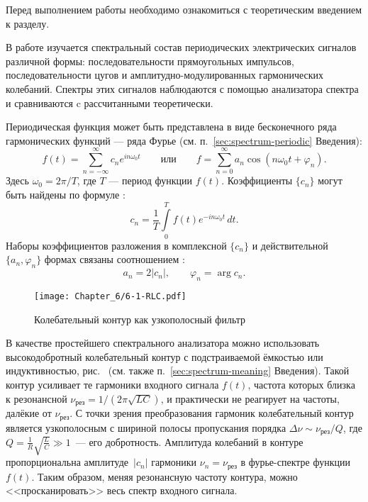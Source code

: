 

Перед выполнением работы необходимо ознакомиться с теоретическим введением
к разделу.

В работе изучается спектральный состав периодических электрических сигналов
различной формы: последовательности прямоугольных импульсов, последовательности
цугов и амплитудно-модулированных гармонических колебаний. Спектры этих сигналов
наблюдаются с помощью анализатора спектра и сравниваются c рассчитанными
теоретически.

Периодическая функция может быть представлена в виде бесконечного ряда
гармонических функций --- ряда Фурье (см. п.~\ref{sec:spectrum-periodic}
Введения):
\begin{equation*}
f(t) = \sum_{n=-\infty}^{\infty} c_n e^{in\omega_0 t}\qquad\text{или}\qquad
f=\sum_{n=0}^{\infty} a_n \cos (n\omega_0 t + \varphi_n).
\end{equation*}
Здесь $\omega_0 = 2\pi/T$, где $T$ --- период функции $f(t)$.
Коэффициенты $\{c_n\}$ могут быть найдены по формуле
:
\begin{equation*}
    c_n=\frac{1}{T}\int\limits_{0}^{T} f(t)e^{-in\omega_0 t}\,dt.
\end{equation*}
Наборы коэффициентов разложения в комплексной $\{c_n\}$ и действительной
$\{a_n,\varphi_n\}$ формах связаны соотношением :
\begin{equation*}
a_n = 2|c_n|,\qquad \varphi_n = \arg c_n.
\end{equation*}

\begin{wrapfigure}{o}{0.3\textwidth}
    \centering
    \texttt{[image: Chapter\_6/6-1-RLC.pdf]}
    \caption{Колебательный контур как узкополосный фильтр}
\end{wrapfigure}

В качестве простейшего спектрального анализатора можно использовать
высокодобротный колебательный контур с подстраиваемой ёмкостью или
индуктивностью, рис.~
(см. также п.~\ref{sec:spectrum-meaning} Введения).
Такой контур усиливает те гармоники входного сигнала $f(t)$,
частота которых близка к резонансной
$\nu_{рез} = 1/(2\pi\sqrt{LC})$, и практически не реагирует на частоты,
далёкие от $\nu_{рез}$. С точки зрения преобразования гармоник колебательный контур
является узкополосным  с шириной полосы
пропускания порядка $\Delta \nu \sim \nu_{рез}/ Q$, где $Q =
\frac{1}{R}\sqrt{\frac{L}{C}} \gg 1$~--- его добротность. Амплитуда колебаний
в контуре пропорциональна амплитуде~$|c_n|$ гармоники $\nu_n=\nu_{рез}$
в фурье-спектре функции $f(t)$. Таким образом, меняя резонансную частоту контура,
можно <<просканировать>> весь спектр входного сигнала.

